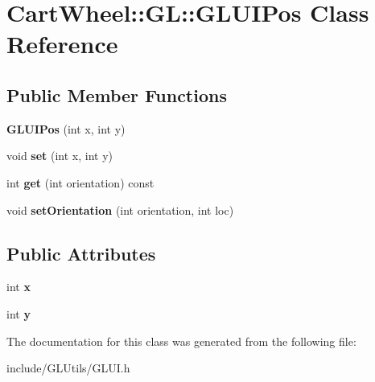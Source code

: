 \hypertarget{classCartWheel_1_1GL_1_1GLUIPos}{
\section{CartWheel::GL::GLUIPos Class Reference}
\label{classCartWheel_1_1GL_1_1GLUIPos}
}
\subsection*{Public Member Functions}
\begin{DoxyCompactItemize}
\item 
\hypertarget{classCartWheel_1_1GL_1_1GLUIPos_ace1b78d15edb4ee97ac52cdc52e9a3c7}{
{\bfseries GLUIPos} (int x, int y)}
\label{classCartWheel_1_1GL_1_1GLUIPos_ace1b78d15edb4ee97ac52cdc52e9a3c7}

\item 
\hypertarget{classCartWheel_1_1GL_1_1GLUIPos_a9115d5673636fc86afebb960df1dcc39}{
void {\bfseries set} (int x, int y)}
\label{classCartWheel_1_1GL_1_1GLUIPos_a9115d5673636fc86afebb960df1dcc39}

\item 
\hypertarget{classCartWheel_1_1GL_1_1GLUIPos_aa0f0b5cebe36699b17fbba95df8f54b8}{
int {\bfseries get} (int orientation) const }
\label{classCartWheel_1_1GL_1_1GLUIPos_aa0f0b5cebe36699b17fbba95df8f54b8}

\item 
\hypertarget{classCartWheel_1_1GL_1_1GLUIPos_aa66579d417938da996c8e9266d202458}{
void {\bfseries setOrientation} (int orientation, int loc)}
\label{classCartWheel_1_1GL_1_1GLUIPos_aa66579d417938da996c8e9266d202458}

\end{DoxyCompactItemize}
\subsection*{Public Attributes}
\begin{DoxyCompactItemize}
\item 
\hypertarget{classCartWheel_1_1GL_1_1GLUIPos_ad111d4801ac340e6491722940e2c4b77}{
int {\bfseries x}}
\label{classCartWheel_1_1GL_1_1GLUIPos_ad111d4801ac340e6491722940e2c4b77}

\item 
\hypertarget{classCartWheel_1_1GL_1_1GLUIPos_a45f24869bb446cf6cee20123be1ccd90}{
int {\bfseries y}}
\label{classCartWheel_1_1GL_1_1GLUIPos_a45f24869bb446cf6cee20123be1ccd90}

\end{DoxyCompactItemize}


The documentation for this class was generated from the following file:\begin{DoxyCompactItemize}
\item 
include/GLUtils/GLUI.h\end{DoxyCompactItemize}
